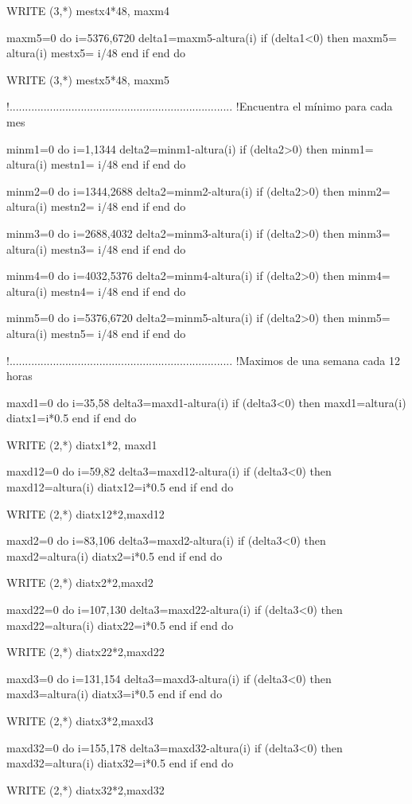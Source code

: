 WRITE (3,*) mestx4*48, maxm4


maxm5=0
do i=5376,6720
delta1=maxm5-altura(i)
if (delta1<0) then
maxm5= altura(i)
mestx5= i/48
end if
end do

WRITE (3,*) mestx5*48, maxm5


!........................................................................
!Encuentra el mínimo para cada mes

minm1=0
do i=1,1344
delta2=minm1-altura(i)
if (delta2>0) then
minm1= altura(i)
mestn1= i/48
end if
end do

minm2=0
do i=1344,2688
delta2=minm2-altura(i)
if (delta2>0) then
minm2= altura(i)
mestn2= i/48
end if
end do

minm3=0
do i=2688,4032
delta2=minm3-altura(i)
if (delta2>0) then
minm3= altura(i)
mestn3= i/48
end if
end do

minm4=0
do i=4032,5376
delta2=minm4-altura(i)
if (delta2>0) then
minm4= altura(i)
mestn4= i/48
end if
end do

minm5=0
do i=5376,6720
delta2=minm5-altura(i)
if (delta2>0) then
minm5= altura(i)
mestn5= i/48
end if
end do

!........................................................................
!Maximos de una semana cada 12 horas

maxd1=0
do i=35,58
delta3=maxd1-altura(i)
if (delta3<0) then
maxd1=altura(i)
diatx1=i*0.5
end if
end do

WRITE (2,*) diatx1*2, maxd1 

maxd12=0
do i=59,82
delta3=maxd12-altura(i)
if (delta3<0) then
maxd12=altura(i)
diatx12=i*0.5
end if
end do

WRITE (2,*) diatx12*2,maxd12

maxd2=0
do i=83,106
delta3=maxd2-altura(i)
if (delta3<0) then
maxd2=altura(i)
diatx2=i*0.5
end if
end do

WRITE (2,*) diatx2*2,maxd2

maxd22=0
do i=107,130
delta3=maxd22-altura(i)
if (delta3<0) then
maxd22=altura(i)
diatx22=i*0.5
end if
end do

WRITE (2,*) diatx22*2,maxd22

maxd3=0
do i=131,154 
delta3=maxd3-altura(i)
if (delta3<0) then
maxd3=altura(i)
diatx3=i*0.5
end if
end do

WRITE (2,*) diatx3*2,maxd3

maxd32=0
do i=155,178
delta3=maxd32-altura(i)
if (delta3<0) then
maxd32=altura(i)
diatx32=i*0.5
end if
end do

WRITE (2,*) diatx32*2,maxd32

